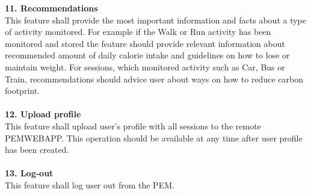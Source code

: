 \documentclass[12pt, a4paper]{report}   %
\begin{document}
\begin{enumerate}
\textbf{11. Recommendations}\\
This feature shall provide the most important information and facts about a type of activity monitored. For example if the Walk or Run activity has been monitored and stored the feature should provide relevant information about recommended amount of daily calorie intake and guidelines on how to lose or maintain weight. For sessions, which monitored activity such as Car, Bus or Train, recommendations should advice user about ways on how to reduce carbon footprint.\\ \\
\textbf{12. Upload profile}\\
This feature shall upload user's profile with all sessions to the remote PEMWEBAPP. This operation should be available at any time after user profile has been created.\\ \\
\textbf{13. Log-out}\\
This feature shall log user out from the PEM.\\ \\

\end{enumerate}
\end{document}
